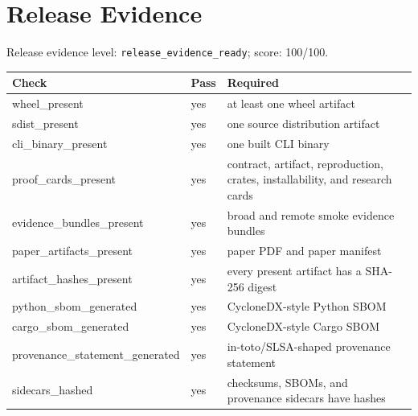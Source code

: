 \section{Release Evidence}
Release evidence level: \texttt{release\_evidence\_ready}; score: 100/100.

\begin{tabular}{lll}
Check & Pass & Required \\
\hline
wheel\_present & yes & at least one wheel artifact \\
sdist\_present & yes & one source distribution artifact \\
cli\_binary\_present & yes & one built CLI binary \\
proof\_cards\_present & yes & contract, artifact, reproduction, crates, installability, and research cards \\
evidence\_bundles\_present & yes & broad and remote smoke evidence bundles \\
paper\_artifacts\_present & yes & paper PDF and paper manifest \\
artifact\_hashes\_present & yes & every present artifact has a SHA-256 digest \\
python\_sbom\_generated & yes & CycloneDX-style Python SBOM \\
cargo\_sbom\_generated & yes & CycloneDX-style Cargo SBOM \\
provenance\_statement\_generated & yes & in-toto/SLSA-shaped provenance statement \\
sidecars\_hashed & yes & checksums, SBOMs, and provenance sidecars have hashes \\
\end{tabular}
